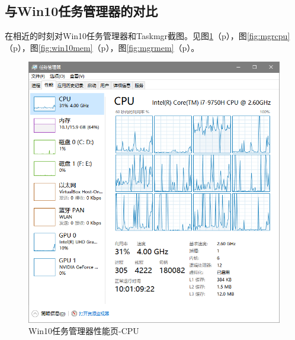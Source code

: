 \documentclass[UTF8,twoside,titlepage]{ctexart}
\newcommand\myref[1]{\ref{#1}（p\pageref{#1}）}
\begin{document}
\subsection{与Win10任务管理器的对比}
在相近的时刻对Win10任务管理器和Taskmgr截图。见图\myref{fig:win10cpu}，图\myref{fig:mgrcpu}，图\myref{fig:win10mem}，图\myref{fig:mgrmem}。

\begin{landscape}
\hspace{0pt}
\vfill

\begin{multicols}{2}
    
\begin{figure}[H]
    \centering
    \includegraphics[scale=0.6]{../media/comparison/win10 perftab cpu.png}
    \caption{Win10任务管理器性能页-CPU}
    \label{fig:win10cpu}
\end{figure}

\columnbreak


\end{multicols}
\end{landscape}
\end{document}
